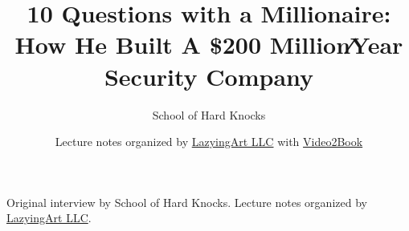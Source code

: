\documentclass[11pt,oneside]{book}
\begin{document}
\frontmatter
\title{10 Questions with a Millionaire: How He Built A \$200 Million∕Year Security Company}
\author{School of Hard Knocks}
\date{Lecture notes organized by \href{https://lazying.art}{LazyingArt LLC} with \href{https://github.com/lachlanchen/Video2Book}{Video2Book}}
\maketitle
\begin{center}
\small Original interview by School of Hard Knocks. Lecture notes organized by \href{https://lazying.art}{LazyingArt LLC}.
\end{center}
\clearpage
\mainmatter

\end{document}
